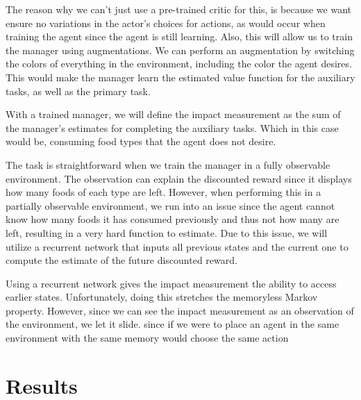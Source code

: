 \documentclass[12pt,A4]{report}
\theoremstyle{definition}
\begin{document}
The reason why we can't just use a pre-trained critic for this, is because we want ensure no variations in the actor's choices for actions, as would occur when training the agent since the agent is still learning. Also, this will allow us to train the manager using augmentations. We can perform an augmentation by switching the colors of everything in the environment, including the color the agent desires. This would make the manager learn the estimated value function for the auxiliary tasks, as well as the primary task. 

With a trained manager, we will define the impact measurement as the sum of the manager's estimates for completing the auxiliary tasks. Which in this case would be, consuming food types that the agent does not desire. 

The task is straightforward when we train the manager in a fully observable environment. The observation can explain the discounted reward since it displays how many foods of each type are left. However, when performing this in a partially observable environment, we run into an issue since the agent cannot know how many foods it has consumed previously and thus not how many are left, resulting in a very hard function to estimate. Due to this issue, we will utilize a recurrent network that inputs all previous states and the current one to compute the estimate of the future discounted reward. 

Using a recurrent network gives the impact measurement the ability to access earlier states. Unfortunately, doing this stretches the memoryless Markov property. However, since we can see the impact measurement as an observation of the environment, we let it slide. since if we were to place an agent in the same environment with the same memory would choose the same action


\chapter{Results}



\end{document}
